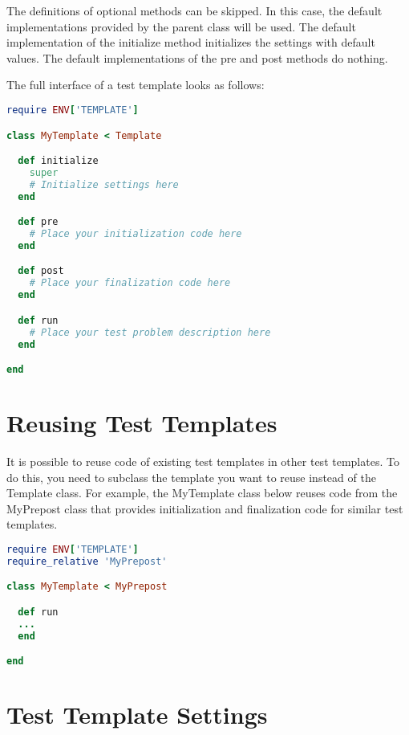 \documentclass[oneside,final,14pt]{extreport}
\begin{document}
{The definitions of optional methods can be skipped. In this case, the default
implementations provided by the parent class will be used. The default implementation
of the initialize method initializes the settings with default values. The default
implementations of the pre and post methods do nothing.

The full interface of a test template looks as follows:

\begin{lstlisting}[language=ruby]
require ENV['TEMPLATE']

class MyTemplate < Template

  def initialize
    super
    # Initialize settings here 
  end

  def pre
    # Place your initialization code here
  end

  def post
    # Place your finalization code here
  end

  def run
    # Place your test problem description here
  end

end
\end{lstlisting}


\section{Reusing Test Templates}

It is possible to reuse code of existing test templates in other test templates.
To do this, you need to subclass the template you want to reuse instead of the
Template class. For example, the MyTemplate class below reuses code from the
MyPrepost class that provides initialization and finalization code for similar
test templates.

\begin{lstlisting}[language=ruby]
require ENV['TEMPLATE']
require_relative 'MyPrepost'

class MyTemplate < MyPrepost

  def run
  ... 
  end

end
\end{lstlisting}


\section{Test Template Settings}

}
\end{document}

